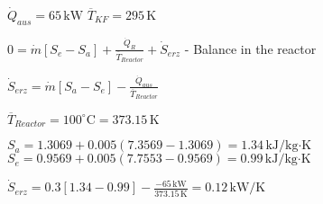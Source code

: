 \( \dot{Q}_{aus} = 65 \, \text{kW} \)  
\( \overline{T}_{KF} = 295 \, \text{K} \)  

\( 0 = \dot{m} [S_e - S_a] + \frac{\dot{Q}_{R}}{\overline{T}_{Reactor}} + \dot{S}_{erz} \)  
- Balance in the reactor  

\( \dot{S}_{erz} = \dot{m} [S_a - S_e] - \frac{\dot{Q}_{aus}}{\overline{T}_{Reactor}} \)  

\( \overline{T}_{Reactor} = 100^\circ \text{C} = 373.15 \, \text{K} \)  

\( S_a = 1.3069 + 0.005 (7.3569 - 1.3069) = 1.34 \, \text{kJ/kg·K} \)  
\( S_e = 0.9569 + 0.005 (7.7553 - 0.9569) = 0.99 \, \text{kJ/kg·K} \)  

\( \dot{S}_{erz} = 0.3 [1.34 - 0.99] - \frac{-65 \, \text{kW}}{373.15 \, \text{K}} = 0.12 \, \text{kW/K} \)